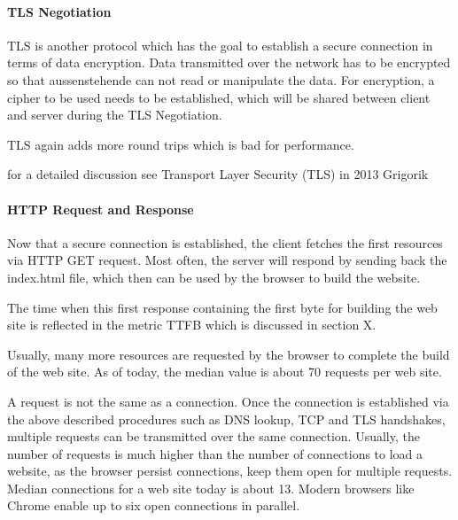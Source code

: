 \paragraph{TLS Negotiation}

TLS is another protocol which has the goal to establish a secure connection in terms of data encryption.
Data transmitted over the network has to be encrypted so that aussenstehende can not read or manipulate the data.
For encryption,  a cipher to be used needs to be established, which will be shared between client and server during the TLS Negotiation. %

TLS again adds more round trips which is bad for performance.

for a detailed discussion see Transport Layer Security (TLS) in 2013 Grigorik %





\paragraph{HTTP Request and Response}

Now that a secure connection is established, the client fetches the first resources via HTTP GET request.
Most often, the server will respond by sending back the index.html file, which then can be used by the browser to build the website. %

The time when this first response containing the first byte for building the web site is reflected in the metric TTFB which is discussed in section X.



Usually, many more resources are requested by the browser to complete the build of the web site.
As of today, the median value is about 70 requests per web site. %

A request is not the same as a connection.
Once the connection is established via the above described procedures such as DNS lookup, TCP and TLS handshakes, multiple requests can be transmitted over the same connection.
Usually, the number of requests is much higher than the number of connections to load a website, as the browser persist connections, keep them open for multiple requests.
Median connections for a web site today is about 13. %
Modern browsers like Chrome enable up to six open connections in parallel. %



